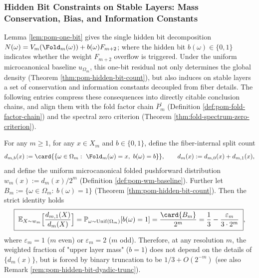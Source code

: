 
\subsubsection{Hidden Bit Constraints on Stable Layers: Mass Conservation, Bias, and Information Constants}\label{subsubsec:pom-hidden-bit-stable-layer-conclusions}
Lemma \ref{lem:pom-one-bit} gives the single hidden bit decomposition
\(
N(\omega)=V_m(\Fold_m(\omega))+b(\omega)F_{m+2}
\);
where the hidden bit \(b(\omega)\in\{0,1\}\) indicates whether the weight \(F_{m+2}\) overflow is triggered.
Under the uniform microcanonical baseline \(u_{\Omega_m}\), this one-bit residual not only determines the global density (Theorem \ref{thm:pom-hidden-bit-count}), but also induces on stable layers a set of conservation and information constants decoupled from fiber details.
The following entries compress these consequences into directly citable conclusion chains, and align them with the fold factor chain \(\overline P_m^{\square}\) (Definition \ref{def:pom-fold-factor-chain}) and the spectral zero criterion (Theorem \ref{thm:fold-spectrum-zero-criterion}).

\begin{conclusion}\label{con:pom-hidden-bit-mass-conservation-truncation}
For any \(m\ge 1\), for any \(x\in X_m\) and \(b\in\{0,1\}\), define the fiber-internal split count
\[
d_{m,b}(x):=\card{\{\omega\in\Omega_m:\ \Fold_m(\omega)=x,\ b(\omega)=b\}},
\qquad
d_m(x):=d_{m,0}(x)+d_{m,1}(x),
\]
and define the uniform microcanonical folded pushforward distribution \(w_m(x):=d_m(x)/2^m\) (Definition \ref{def:pom-wm-baseline}).
Further let \(B_m:=\{\omega\in\Omega_m:\ b(\omega)=1\}\) (Theorem \ref{thm:pom-hidden-bit-count}).
Then the strict identity holds
\[
\boxed{\;
\mathbb E_{X\sim w_m}\Bigl[\frac{d_{m,1}(X)}{d_m(X)}\Bigr]
=\mathbb P_{\omega\sim\mathrm{Unif}(\Omega_m)}[b(\omega)=1]
=\frac{\card{B_m}}{2^m}
=\frac13-\frac{\varepsilon_m}{3\cdot 2^m}\;},
\]
where \(\varepsilon_m=1\) (\(m\) even) or \(\varepsilon_m=2\) (\(m\) odd).
Therefore, at any resolution \(m\), the weighted fraction of "upper layer mass" (\(b=1\)) does not depend on the details of \(\{d_m(x)\}\), but is forced by binary truncation to be \(1/3+O(2^{-m})\) (see also Remark \ref{rem:pom-hidden-bit-dyadic-trunc}).
\end{conclusion}

